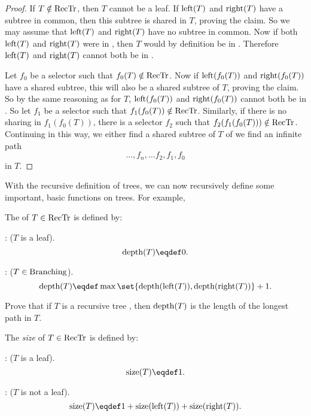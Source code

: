 \begin{proof}
If $T \notin \text{RecTr}$, then $T$ cannot be a leaf.  If $\text{left}(T)$
and $\text{right}(T)$ have a subtree in common, then this subtree is
shared in $T$, proving the claim.  So we may assume that
$\text{left}(T)$ and $\text{right}(T)$ have no subtree in common.  Now
if both $\text{left}(T)$ and $\text{right}(T)$ were in \rectr, then $T$
would by definition be in \rectr.  Therefore $\text{left}(T)$ and $\text{right}(T)$
cannot both be in \rectr.

Let $f_0$ be a selector such that $f_0(T) \notin \text{RecTr}$.  Now if
$\text{left}(f_0(T))$ and $\text{right}(f_0(T))$ have a shared subtree, this
will also be a shared subtree of $T$, proving the claim.  So by the
same reasoning as for $T$, $\text{left}(f_0(T))$ and $\text{right}(f_0(T))$
cannot both be in \rectr.  So let $f_1$ be a selector such that
$f_1(f_0(T)) \notin \text{RecTr}$.  Similarly, if there is no sharing in
$f_1(f_0(T))$, there is a selector $f_2$ such that $f_2(f_1(f_0(T)))
\notin \text{RecTr}$.  Continuing in this way, we either find a shared subtree of $T$ of we
find an infinite path
\[
\dots,f_n,\dots f_2,f_1,f_0
\]
in $T$.
\end{proof}

With the recursive definition of trees, we can now recursively define
some important, basic functions on trees.  For example,

\begin{definition}
The  of $T \in \text{RecTr}$ is defined by:

: ($T$ is a leaf).
\[
\trdpth{T} \eqdef 0.
\]

: ($T \in\text{Branching}$).
\[
\trdpth{T} \eqdef \max\set{\trdpth{\leftsub{(T)}}, \trdpth{\rightsub{(T)}}} + 1.
\]
\end{definition}

\begin{problem}
Prove that if $T$ is a recursive tree \rectr, then $\text{depth}(T)$ is the
length of the longest path in $T$.
\begin{solution}
\end{solution}
\end{problem}

\begin{definition}
The \emph{size} of $T \in \text{RecTr}$ is defined by:

: ($T$ is a leaf).
\[
\sizetr{T} \eqdef 1.
\]

: ($T$ is not a leaf).
\[
\sizetr{T} \eqdef 1 + \sizetr{\leftsub{(T)}} + \sizetr{\rightsub{(T)}}.
\]
\end{definition}

